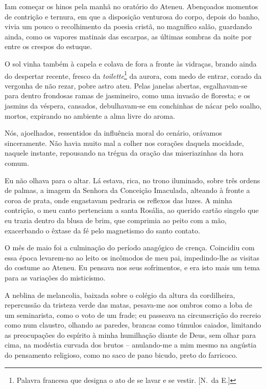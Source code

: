 Iam começar os hinos pela manhã no oratório do Ateneu.
Abençoados momentos de contrição e ternura, em que a disposição
venturosa do corpo, depois do banho, vivia um pouco o recolhimento da
poesia cristã, no magnífico salão, guardando ainda, como os vapores
matinais das escarpas, as últimas sombras da noite por entre os crespos
do estuque. 

O sol vinha também à capela e colava de fora a fronte às
vidraças, brando ainda do despertar recente, fresco da \textit{toilette}\footnote{ Palavra francesa 
que designa o ato de se lavar e se vestir. [N.~da E.]} da
aurora, com medo de entrar, corado da vergonha de não rezar, pobre
astro ateu. Pelas janelas abertas, esgalhavam{}-se para dentro
frondosas ramas de jasmineiro, como uma invasão de floresta; e os
jasmins da véspera, cansados, debulhavam{}-se em conchinhas de nácar
pelo soalho, mortos, expirando no ambiente a alma livre do aroma. 


Nós, ajoelhados, ressentidos da influência moral do cenário, orávamos
sinceramente. Não havia muito mal a colher nos corações daquela
mocidade, naquele instante, repousando na trégua da oração das
miseriazinhas da hora comum. 

Eu não olhava para o altar. Lá estava,
rica, no trono iluminado, sobre três ordens de palmas, a imagem da
Senhora da Conceição Imaculada, alteando à fronte a coroa de prata,
onde engastavam pedraria os reflexos das luzes. A minha contrição, o
meu canto pertenciam a santa Rosália, ao querido cartão singelo que eu
trazia dentro da blusa de brim, que comprimia ao peito com a mão,
exacerbando o êxtase da fé pelo magnetismo do santo contato. 

O mês de maio foi a culminação do período anagógico de crença. Coincidiu com
essa época levarem{}-no ao leito os incômodos de meu pai,
impedindo{}-lhe as visitas do costume ao Ateneu. Eu pensava nos seus
sofrimentos, e era isto mais um tema para as variações do misticismo.

A neblina de melancolia, baixada sobre o colégio da altura da
cordilheira, repercussão da tristeza verde das matas, pesava{}-me aos
ombros como a loba de um seminarista, como o voto de um frade; eu
passeava na circunscrição do recreio como num claustro, olhando as
paredes, brancas como túmulos caiados, limitando as preocupações do
espírito à minha humilhação diante de Deus, sem olhar para cima, na
modéstia curvada dos brutos -- anulando{}-me a mim mesmo na angústia
do pensamento religioso, como no saco de pano bicudo, preto do farricoco. 

